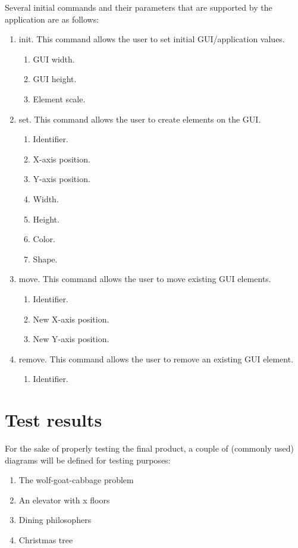 \documentclass[12pt,a4paper]{article}
\begin{document}
Several initial commands and their parameters that are supported by the application are as follows:
\begin{enumerate}
	\item init. This command allows the user to set initial GUI/application values.
		\begin{enumerate}
			\item GUI width.
			\item GUI height.
			\item Element scale.
		\end{enumerate}
	\item set. This command allows the user to create elements on the GUI.
		\begin{enumerate}
			\item Identifier.
			\item X-axis position.
			\item Y-axis position.
			\item Width.
			\item Height.
			\item Color.
			\item Shape.
		\end{enumerate}
	\item move. This command allows the user to move existing GUI elements.
		\begin{enumerate}
			\item Identifier.
			\item New X-axis position.
			\item New Y-axis position.
		\end{enumerate}
	\item remove. This command allows the user to remove an existing GUI element.
		\begin{enumerate}
			\item Identifier.
		\end{enumerate}
\end{enumerate}


\clearpage
\section{Test results}

For the sake of properly testing the final product, a couple of (commonly used) diagrams will be defined for testing purposes:

\begin{enumerate}
	\item The wolf-goat-cabbage problem
	\item An elevator with x floors
	\item Dining philosophers
	\item Christmas tree
\end{enumerate}
\end{document}
